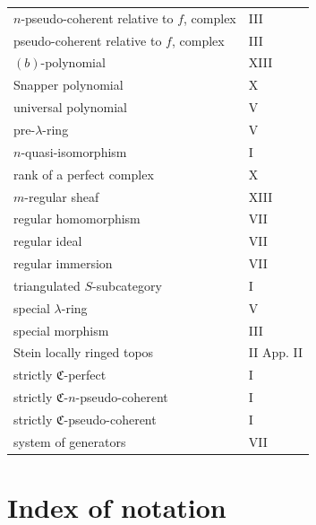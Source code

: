\documentclass[12pt]{article}
\begin{document}
\begin{longtable}{p{8.5cm}l}
$n$-pseudo-coherent relative to $f$, complex & III\\
pseudo-coherent relative to $f$, complex & III\\
$(b)$-polynomial & XIII\\
Snapper polynomial & X\\
universal polynomial & V\\
pre-$\lambda$-ring & V\\
$n$-quasi-isomorphism & I\\
rank of a perfect complex & X\\
$m$-regular sheaf & XIII\\
regular homomorphism & VII\\
regular ideal & VII\\
regular immersion & VII\\
triangulated $S$-subcategory & I\\
special $\lambda$-ring & V\\
special morphism & III\\
Stein locally ringed topos & II App. II\\
strictly $\mathfrak C$-perfect & I\\
strictly $\mathfrak C$-$n$-pseudo-coherent & I\\
strictly $\mathfrak C$-pseudo-coherent & I\\
system of generators & VII\\
\bottomrule
\end{longtable}

\newpage
\section*{Index of notation}
\end{document}
